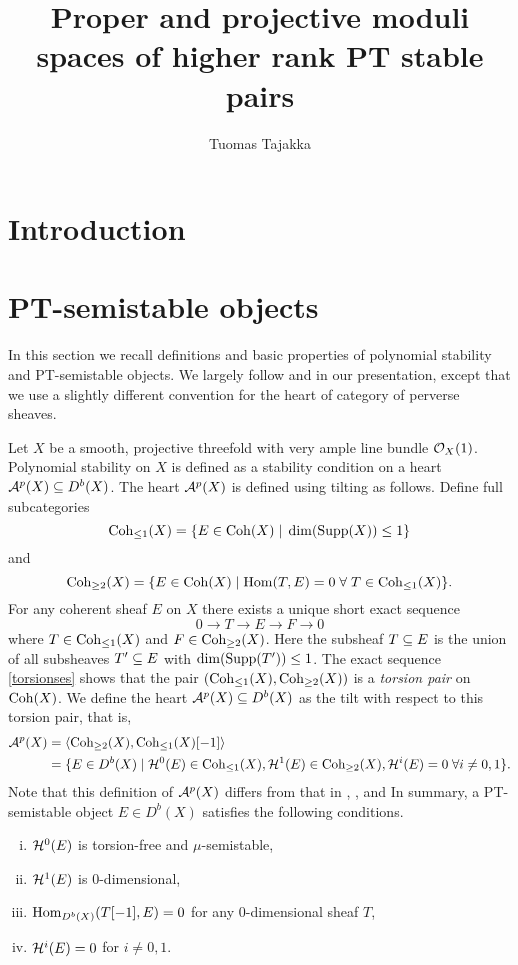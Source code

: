 \documentclass[letterpaper,10pt]{article}
\title{Proper and projective moduli spaces of higher rank PT stable pairs}
\author{Tuomas Tajakka}
\date{}
\theoremstyle{remark}
\begin{document}
\maketitle

\section{Introduction}

\section{PT-semistable objects}
In this section we recall definitions and basic properties of polynomial stability and PT-semistable objects. We largely follow \cite{lo-PT1} and \cite{lo-PT2} in our presentation, except that we use a slightly different convention for the heart of category of perverse sheaves.

Let $X$ be a smooth, projective threefold with very ample line bundle $\mathcal{O}_X(1)$. Polynomial stability on $X$ is defined as a stability condition on a heart $\mathcal{A}^p(X) \subseteq D^b(X)$. The heart $\mathcal{A}^p(X)$ is defined using tilting as follows. Define full subcategories
\[ \mathrm{Coh}_{\le 1}(X) = \{ E \in \mathrm{Coh}(X) \;|\; \dim(\operatorname{\mathrm{Supp}}(X)) \le 1 \} \]
and
\[ \mathrm{Coh}_{\ge 2}(X) = \{ E \in \mathrm{Coh}(X) \;|\; \mathrm{Hom}(T,E) = 0 \; \forall \; T \in \mathrm{Coh}_{\le 1}(X) \}. \]
For any coherent sheaf $E$ on $X$ there exists a unique short exact sequence
\begin{equation}\label{torsionses}
    0 \to T \to E \to F \to 0
\end{equation} 
where $T \in \mathrm{Coh}_{\le 1}(X)$ and $F \in \mathrm{Coh}_{\ge 2}(X)$. Here the subsheaf $T \subseteq E$ is the union of all subsheaves $T' \subseteq E$ with $\dim(\operatorname{\mathrm{Supp}}(T')) \le 1$. The exact sequence \eqref{torsionses} shows that the pair $(\mathrm{Coh}_{\le 1}(X), \mathrm{Coh}_{\ge 2}(X))$ is a \emph{torsion pair} on $\mathrm{Coh}(X)$. We define the heart $\mathcal{A}^p(X) \subseteq D^b(X)$ as the tilt with respect to this torsion pair, that is,
\begin{align}\label{perverseheart}
    \mathcal{A}^p(X) & = \langle \mathrm{Coh}_{\ge 2}(X), \mathrm{Coh}_{\le 1}(X)[-1] \rangle \\
             & = \{ E \in D^b(X) \;|\; \mathcal{H}^0(E) \in \mathrm{Coh}_{\le 1}(X), \mathcal{H}^1(E) \in \mathrm{Coh}_{\ge 2}(X), \mathcal{H}^i(E) = 0 \;\forall i \neq 0,1 \}. \nonumber
\end{align}
Note that this definition of $\mathcal{A}^p(X)$ differs from that in \cite{lo-PT1}, \cite{lo-PT2}, and 
In summary, a PT-semistable object $E \in D^b(X)$ satisfies the following conditions.
\begin{enumerate}[(i)]
    \item $\mathcal{H}^0(E)$ is torsion-free and $\mu$-semistable,
    \item $\mathcal{H}^1(E)$ is 0-dimensional,
    \item $\mathrm{Hom}_{D^b(X)}(T[-1], E) = 0$ for any 0-dimensional sheaf $T$,
    \item $\mathcal{H}^i(E) = 0$ for $i \neq 0, 1$.
\end{enumerate}
\end{document}
